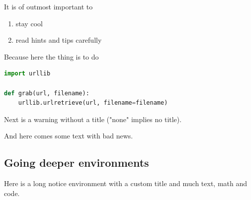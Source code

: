 \documentclass[%
oneside,                 %
final,                   %
10pt]{article}
\newenvironment{warningshaded}
{\def\FrameCommand{\fboxsep=3mm\colorbox{yellowicon_warning_background}}
 \MakeFramed {\advance\hsize-\width \FrameRestore}}{\endMakeFramed}
\newenvironment{warning_yellowiconadmon}[1][Warning]{
\begin{warningshaded}
\noindent
\begin{figure}
\vspace{-13pt}
\texttt{[image: latex\_figs/small\_yellow\_warning]}
\end{figure} \textbf{#1}\par
\nobreak\noindent\ignorespaces
}
{
\end{warningshaded}
}
\begin{document}
\begin{warning_yellowiconadmon}[Tip]
It is of outmost important to

\begin{enumerate}
\item stay cool

\item read hints and tips carefully
\end{enumerate}

\noindent
Because here the thing is to do






\begin{lstlisting}[language=python,style=simple,xleftmargin=2mm]
import urllib

def grab(url, filename):
    urllib.urlretrieve(url, filename=filename)

\end{lstlisting}
\end{warning_yellowiconadmon} %



Next is a warning without a title ("none" implies no title).


\begin{warning_yellowiconadmon}[]
And here comes some text with bad news.
\end{warning_yellowiconadmon} %



\subsection{Going deeper environments}

Here is a long notice environment with a custom title and much
text, math and code.
\end{document}
